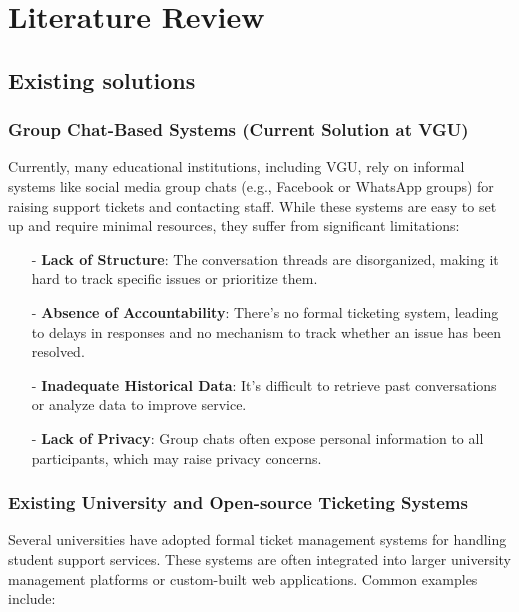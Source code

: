 \section{Literature Review}

\subsection{Existing solutions}

	\subsubsection{Group Chat-Based Systems (Current Solution at VGU)}
		Currently, many educational institutions, including VGU, rely on informal systems like social media group chats (e.g., Facebook or WhatsApp groups) for raising support tickets and contacting staff. While these systems are easy to set up and require minimal resources, they suffer from significant limitations:
		
		\begin{itemize}
			\item[-] \textbf{Lack of Structure}: The conversation threads are disorganized, making it hard to track specific issues or prioritize them.
			
			\item[-] \textbf{Absence of Accountability}: There’s no formal ticketing system, leading to delays in responses and no mechanism to track whether an issue has been resolved.
			
			\item[-] \textbf{Inadequate Historical Data}: It's difficult to retrieve past conversations or analyze data to improve service.
			
			\item[-] \textbf{Lack of Privacy}: Group chats often expose personal information to all participants, which may raise privacy concerns.
		\end{itemize}
		
		
		\subsubsection{Existing University and Open-source Ticketing Systems}
		Several universities have adopted formal ticket management systems for handling student support services. These systems are often integrated into larger university management platforms or custom-built web applications. Common examples include:
		
